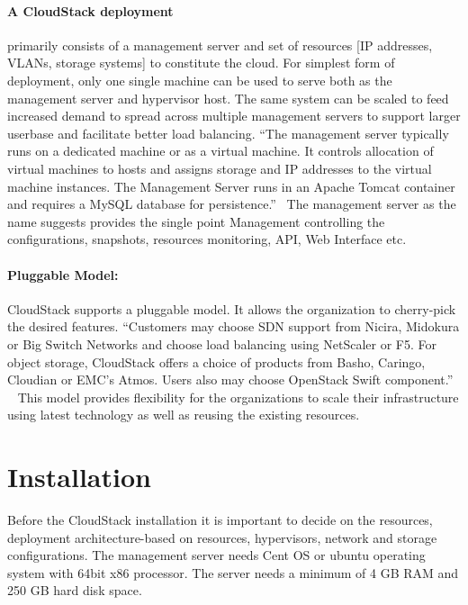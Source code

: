 \paragraph {A CloudStack deployment} primarily consists of a management server and
set of resources [IP addresses, VLANs, storage systems] to constitute
the cloud.  For simplest form of deployment, only one single machine
can be used to serve both as the management server and hypervisor
host. The same system can be scaled to feed increased demand to spread
across multiple management servers to support larger userbase and
facilitate better load balancing. ``The management server typically runs
on a dedicated machine or as a virtual machine. It controls allocation
of virtual machines to hosts and assigns storage and IP addresses to
the virtual machine instances. The Management Server runs in an Apache
Tomcat container and requires a MySQL database for
persistence.''~\cite{hid-sp18-417-www-cloudstack-management-server} 
The management server as the name suggests provides the single point 
Management controlling the configurations, snapshots, resources monitoring, 
API, Web Interface etc. 

\paragraph {Pluggable Model:} CloudStack supports a pluggable model. It 
allows the organization to cherry-pick the desired features. ``Customers may 
choose SDN support from Nicira, Midokura or Big Switch Networks and choose load
balancing using NetScaler or F5. For object storage, CloudStack offers a choice of
products from Basho, Caringo, Cloudian or EMC's Atmos. Users also may choose
OpenStack Swift component.'' ~\cite{hid-sp18-417-www-cloudstack-model}
This model provides flexibility for the organizations to scale their infrastructure 
using latest technology as well as reusing the existing resources.

\section{Installation}

Before the CloudStack installation it is important to decide on the resources,
deployment architecture-based on resources, hypervisors, network and storage 
configurations. The management server needs Cent OS or ubuntu operating system
with 64bit x86 processor. The server needs a minimum of 4 GB RAM and 250 GB
hard disk space. 

